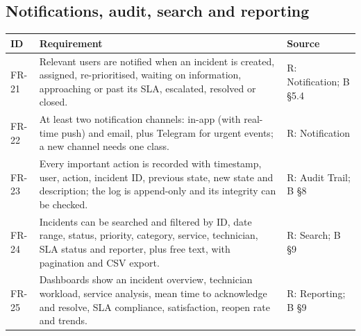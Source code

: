 \subsection*{Notifications, audit, search and reporting}
\begin{longtable}{@{}l>{\raggedright\arraybackslash}p{9.6cm}l@{}}
\toprule
\textbf{ID} & \textbf{Requirement} & \textbf{Source} \\
\midrule
\endhead
FR-21 & Relevant users are notified when an incident is created, assigned, re-prioritised,
  waiting on information, approaching or past its SLA, escalated, resolved or closed. &
  R: Notification; B §5.4 \\
FR-22 & At least two notification channels: in-app (with real-time push) and email, plus
  Telegram for urgent events; a new channel needs one class. & R: Notification \\
FR-23 & Every important action is recorded with timestamp, user, action, incident ID, previous
  state, new state and description; the log is append-only and its integrity can be checked. &
  R: Audit Trail; B §8 \\
FR-24 & Incidents can be searched and filtered by ID, date range, status, priority, category,
  service, technician, SLA status and reporter, plus free text, with pagination and CSV export.
  & R: Search; B §9 \\
FR-25 & Dashboards show an incident overview, technician workload, service analysis, mean time
  to acknowledge and resolve, SLA compliance, satisfaction, reopen rate and trends. &
  R: Reporting; B §9 \\
\bottomrule
\end{longtable}

